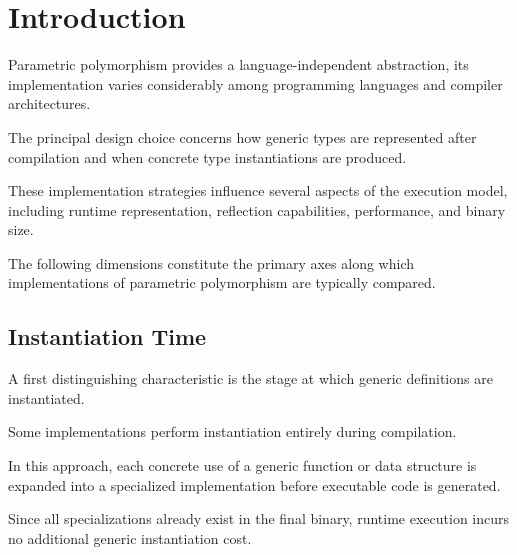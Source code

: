 \documentclass[11pt]{report}
\begin{document}
\clearpage



\clearpage
\tableofcontents
\clearpage


\setcounter{chapter}{-1}

\chapter{Introduction}
\label{Introduction}
Parametric polymorphism provides a language-independent abstraction, its
implementation varies considerably among programming languages and compiler
architectures.

The principal design choice concerns how generic types are represented after
compilation and when concrete type instantiations are produced.

These implementation strategies influence several aspects of the execution
model, including runtime representation, reflection capabilities, performance,
and binary size.


The following dimensions constitute the primary axes along which implementations
of parametric polymorphism are typically compared.



\label{Introduction: Instantiation Time}
\section{Instantiation Time}


A first distinguishing characteristic is the stage at which generic definitions
are instantiated.

Some implementations perform instantiation entirely during compilation.

In this approach, each concrete use of a generic function or data structure is
expanded into a specialized implementation before executable code is generated.

Since all specializations already exist in the final binary, runtime execution
incurs no additional generic instantiation cost.
\end{document}
